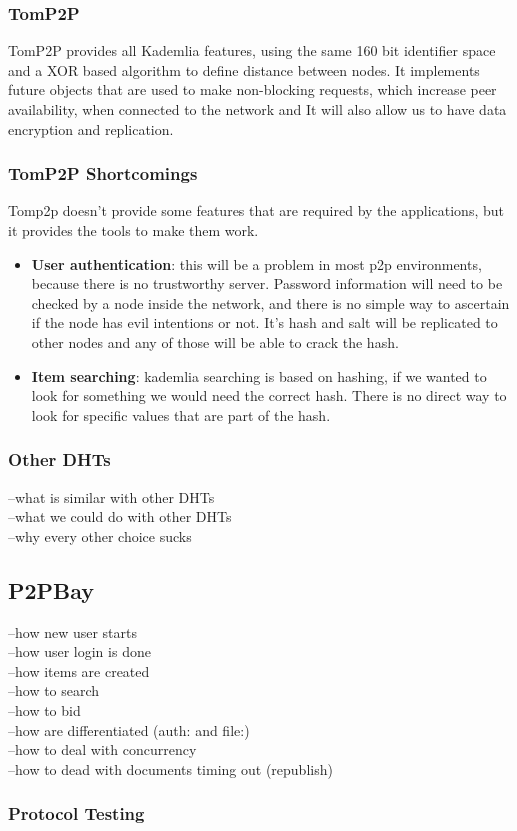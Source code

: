 \documentclass[a4paper]{article}
\begin{document}
\subsubsection{TomP2P}
	TomP2P provides all Kademlia features, using the same 160 bit identifier space and a XOR based algorithm to define distance between nodes. It implements future objects that are used to make non-blocking requests, which increase peer availability, when connected to the network and It will also allow us to have data encryption and replication.
   
\subsubsection{TomP2P Shortcomings}
    Tomp2p doesn't provide some features that are required by the applications, but it provides the tools to make them work.
\begin{itemize}
    	\item \textbf{User authentication}: this will be a problem in most p2p environments, because there is no trustworthy server. Password information will need to be checked by a node inside the network, and there is no simple way to ascertain if the node has evil intentions or not. It's hash and salt will be replicated to other nodes and any of those will be able to crack the hash.
    \item \textbf{Item searching}: kademlia searching is based on hashing, if we wanted to look for something we would need the correct hash. There is no direct way to look for specific values that are part of the hash.
\end{itemize}

   
\subsubsection{Other DHTs}
	--what is similar with other DHTs
	\\--what we could do with other DHTs
	\\--why every other choice sucks


\subsection{P2PBay}
	--how new user starts\\
    --how user login is done\\
    --how items are created\\
    --how to search\\
    --how to bid\\
    --how are differentiated (auth: and file:)\\ 
    --how to deal with concurrency\\
    --how to dead with documents timing out (republish)

\subsubsection{Protocol Testing}
\end{document}
